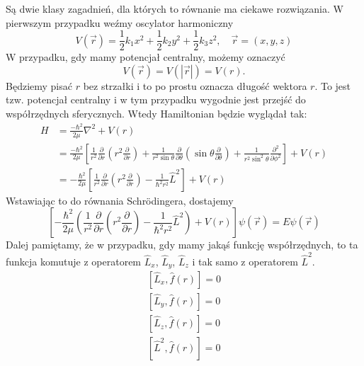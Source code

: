 Są dwie klasy zagadnień, dla których to równanie ma ciekawe rozwiązania.
W pierwszym przypadku weźmy oscylator harmoniczny
\begin{equation*}
	V(\vec{r})=\frac{1}{2} k_{1} x^{2}+\frac{1}{2} k_{2} y^{2}+\frac{1}{2} k_{3} z^{2}, \quad \vec{r} = (x, y, z)
\end{equation*}
W przypadku, gdy mamy potencjał centralny, możemy oznaczyć
\begin{equation*}
	V(\vec{r}) = V(|\vec{r}|) = V(r).
\end{equation*}
Będziemy pisać $r$ bez strzałki i to po prostu oznacza długość wektora $r$. To jest tzw. potencjał centralny i w tym przypadku wygodnie jest przejść do współrzędnych sferycznych. Wtedy Hamiltonian będzie wyglądał tak:
\begin{equation*}
	\begin{split}
		H &=\frac{-\hbar^{2}}{2 \mu} \nabla^{2}+V(r) \\
		&= \frac{-\hbar^{2}}{2 \mu} \left[ \frac{1}{r^{2}} \frac{\partial}{\partial r} \left( r^{2} \frac{\partial}{\partial r} \right) + \frac{1}{r^{2} \sin \theta} \frac{\partial}{\partial \theta} \left( \sin \theta \frac{\partial}{\partial \theta} \right) + \frac{1}{r^{2} \sin^{2} \theta} \frac{\partial^{2}}{\partial \phi^{2}} \right] +V(r) \\
		&= -\frac{\hbar^2}{2\mu} \left[ \frac{1}{r^2} \frac{\partial}{\partial r} \left( r^2 \frac{\partial}{\partial r} \right) - \frac{1}{\hbar^2 r^2} \hat{L}^2 \right] + V(r)
	\end{split}
\end{equation*}
Wstawiając to do równania Schrödingera, dostajemy
\begin{equation*}
	\left[ -\frac{\hbar^2}{2\mu} \left( \frac{1}{r^2} \frac{\partial}{\partial r} \left( r^2 \frac{\partial}{\partial r} \right) - \frac{1}{\hbar^2 r^2} \hat{L}^2 \right) + V(r) \right] \psi(\vec{r}) = E \psi(\vec{r})
\end{equation*}
Dalej pamiętamy, że w przypadku, gdy mamy jakąś funkcję współrzędnych, to ta funkcja komutuje z operatorem $\hat{L}_x$, $\hat{L}_y$, $\hat{L}_z$ i tak samo z operatorem $\hat{L}^2$.
\begin{equation*}
	\begin{split}
		[\hat{L}_x, \hat{f}(r)] = 0 \\
		[\hat{L}_y, \hat{f}(r)] = 0 \\
		[\hat{L}_z, \hat{f}(r)] = 0 \\
		[\hat{L}^2, \hat{f}(r)] = 0 
	\end{split}
\end{equation*}
